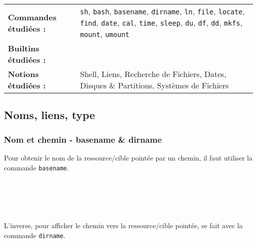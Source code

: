 \newcommand{\defaultparindent}{\parindent}
\setlength{\parindent}{0pt}				%

\begin{center}
\begin{tabular}{p{5cm} p{11cm}}
\textbf{Commandes étudiées :} & \texttt{sh}, \texttt{bash}, \texttt{basename}, \texttt{dirname}, \texttt{ln}, \texttt{file}, \texttt{locate}, \texttt{find}, \texttt{date}, \texttt{cal}, \texttt{time}, \texttt{sleep}, \texttt{du}, \texttt{df}, \texttt{dd}, \texttt{mkfs}, \texttt{mount}, \texttt{umount}\\

\textbf{Builtins étudiées :} & \\

\textbf{Notions étudiées :} & Shell, Liens, Recherche de Fichiers, Dates, Disques \& Partitions, Systèmes de Fichiers\\
\end{tabular}
\end{center}

\bigskip

\subsection{Noms, liens, type}

\subsubsection{Nom et chemin - basename \& dirname}

\bigskip

Pour obtenir le nom de la ressource/cible pointée par un chemin, il faut utiliser la commande \texttt{basename}.\\

\\
\\
\\
\\
\\

L'inverse, pour afficher le chemin vers la ressource/cible pointée, se fait avec la commande \texttt{dirname}.\\

\\
\\
\\
\\
\\

